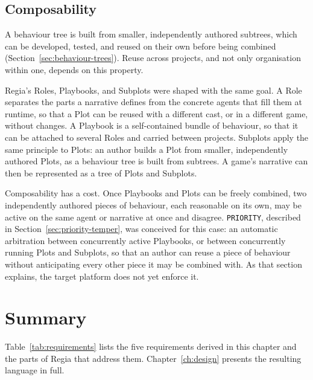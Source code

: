 \subsection{Composability}
A behaviour tree is built from smaller, independently authored subtrees, which can be developed, tested, and reused on their own before being combined (Section~\ref{sec:behaviour-trees}). Reuse across projects, and not only organisation within one, depends on this property.
 
Regia's Roles, Playbooks, and Subplots were shaped with the same goal. A Role separates the parts a narrative defines from the concrete agents that fill them at runtime, so that a Plot can be reused with a different cast, or in a different game, without changes. A Playbook is a self-contained bundle of behaviour, so that it can be attached to several Roles and carried between projects. Subplots apply the same principle to Plots: an author builds a Plot from smaller, independently authored Plots, as a behaviour tree is built from subtrees. A game's narrative can then be represented as a tree of Plots and Subplots.
 
Composability has a cost. Once Playbooks and Plots can be freely combined, two independently authored pieces of behaviour, each reasonable on its own, may be active on the same agent or narrative at once and disagree. \lstinline|PRIORITY|, described in Section~\ref{sec:priority-temper}, was conceived for this case: an automatic arbitration between concurrently active Playbooks, or between concurrently running Plots and Subplots, so that an author can reuse a piece of behaviour without anticipating every other piece it may be combined with. As that section explains, the target platform does not yet enforce it.
 
\section{Summary}
\label{sec:requirements-summary}
Table~\ref{tab:requirements} lists the five requirements derived in this chapter and the parts of Regia that address them. Chapter~\ref{ch:design} presents the resulting language in full.
 

